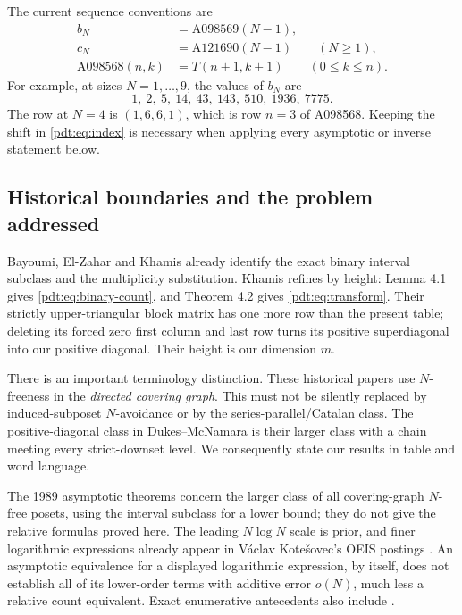 The current sequence conventions \cite{oeis} are
\begin{equation}\label{pdt:eq:index}
 \begin{split}
 b_N&=\mathrm{A098569}(N-1),\\
 c_N&=\mathrm{A121690}(N-1)\qquad(N\ge1),\\
 \mathrm{A098568}(n,k)&=T(n+1,k+1)\qquad(0\le k\le n).
 \end{split}
\end{equation}
For example, at sizes $N=1,\ldots,9$, the values of $b_N$ are
\[
 1,\ 2,\ 5,\ 14,\ 43,\ 143,\ 510,\ 1936,\ 7775.
\]
The row at $N=4$ is $(1,6,6,1)$, which is row $n=3$ of A098568. Keeping the shift in \eqref{pdt:eq:index} is necessary when applying every asymptotic or inverse statement below.

\subsection{Historical boundaries and the problem addressed}
Bayoumi, El-Zahar and Khamis \cite{bek} already identify the exact binary interval subclass and the multiplicity substitution. Khamis \cite{khamis} refines by height: Lemma 4.1 gives \eqref{pdt:eq:binary-count}, and Theorem 4.2 gives \eqref{pdt:eq:transform}. Their strictly upper-triangular block matrix has one more row than the present table; deleting its forced zero first column and last row turns its positive superdiagonal into our positive diagonal. Their height is our dimension $m$.

There is an important terminology distinction. These historical papers use $N$-freeness in the \emph{directed covering graph}. This must not be silently replaced by induced-subposet $N$-avoidance or by the series-parallel/Catalan class. The positive-diagonal class in Dukes--McNamara \cite{dm} is their larger class with a chain meeting every strict-downset level. We consequently state our results in table and word language.

The 1989 asymptotic theorems concern the larger class of all covering-graph $N$-free posets, using the interval subclass for a lower bound; they do not give the relative formulas proved here. The leading $N\log N$ scale is prior, and finer logarithmic expressions already appear in V\'aclav Kote\v{s}ovec's OEIS postings \cite{oeis}. An asymptotic equivalence for a displayed logarithmic expression, by itself, does not establish all of its lower-order terms with additive error $o(N)$, much less a relative count equivalent. Exact enumerative antecedents also include \cite{kr,bcuf,cfz}.

